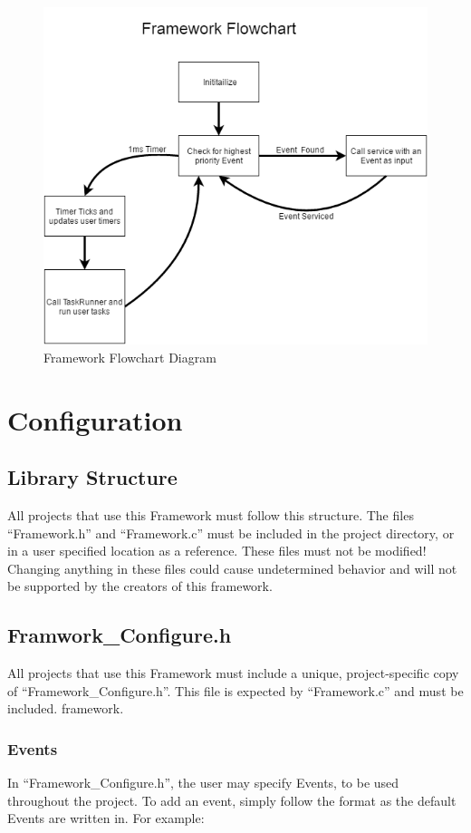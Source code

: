 \documentclass[12pt compsoc]{article}
\begin{document}
\begin{figure}[H]
\centering
\includegraphics[width=6in]{FrameworkDiagram.PNG}
\caption{Framework Flowchart Diagram}
\label{fig_frameworkDiagram}
\end{figure}


\section{Configuration}
\subsection{Library Structure}
All projects that use this Framework must follow this structure. The files ``Framework.h'' and ``Framework.c'' must be included in the project directory, or in a user specified location as a reference. These files must not be modified! Changing anything in these files could cause undetermined behavior and will not be supported by the creators of this framework.
\subsection{Framwork\_Configure.h}
All projects that use this Framework must include a unique, project-specific copy of ``Framework\_Configure.h''. This file is expected by ``Framework.c'' and must be included.
framework.
\subsubsection{Events}
In ``Framework\_Configure.h'', the user may specify Events, to be used throughout the project. To add an event, simply follow the format as the default Events are written in. For example:
\end{document}

